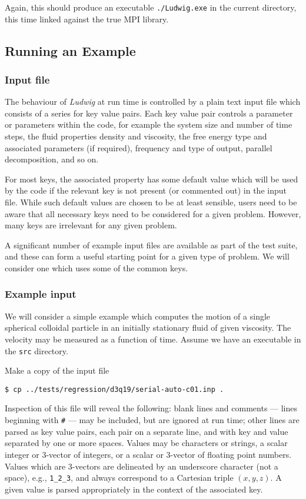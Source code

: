 Again, this should produce an executable \texttt{./Ludwig.exe}
in the current directory, this time linked against the true MPI
library.

\subsection{Running an Example}

\subsubsection{Input file}

The behaviour of \textit{Ludwig} at run time is controlled by
a plain text input file which consists of a series for key value
pairs. Each key value pair controls a parameter or parameters
within the code, for example the system size and number of time steps,
the fluid properties density and viscosity, the free energy type
and associated parameters (if required), frequency and type of
output, parallel decomposition, and so on.

For most keys, the associated property has some default value which
will be used by the code if the relevant key is not present (or
commented out) in the input file. While such default values are
chosen to be at least sensible, users need to be aware that all
necessary keys need to be considered for a given problem. However,
many keys are irrelevant for any given problem.

A significant number of example input files are available as
part of the test suite, and these can form a useful starting
point for a given type of problem. We will consider one which
uses some of the common keys.

\subsubsection{Example input}

We will consider a simple example which computes the motion of
a single spherical colloidal particle in an initially stationary
fluid of given viscosity. The velocity may be measured as a
function of time. Assume we have an executable in the \texttt{src}
directory.

Make a copy of the input file
\begin{lstlisting}
$ cp ../tests/regression/d3q19/serial-auto-c01.inp .
\end{lstlisting}

Inspection of this file will reveal the following: blank lines
and comments --- lines beginning with \texttt{\#} --- may be included,
but are ignored at run time; other lines are parsed as key value
pairs, each pair on a separate line, and with key and value separated
by one or more spaces. Values may be characters or strings, a
scalar integer or 3-vector of integers, or a scalar or 3-vector
of floating point numbers. Values which are 3-vectors are delineated
by an underscore character (not a space), e.g., \texttt{1\_2\_3},
and always correspond to a Cartesian triple $(x,y,z)$.
A given value is parsed appropriately in the context of the associated key.


